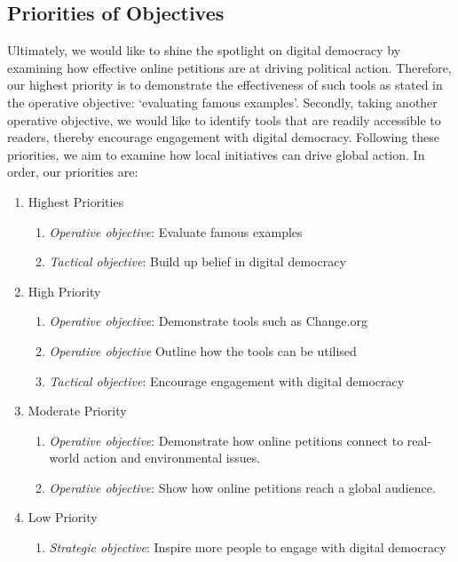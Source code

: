 \subsection{Priorities of Objectives}
Ultimately, we would like to shine the spotlight on digital democracy by examining how effective online petitions are at driving political action. Therefore, our highest priority is to demonstrate the effectiveness of such tools as stated in the operative objective: `evaluating famous examples'. Secondly, taking another operative objective, we would like to identify tools that are readily accessible to readers, thereby encourage engagement with digital democracy. Following these priorities, we aim to examine how local initiatives can drive global action. In order, our priorities are:

\begin{enumerate}
	\item Highest Priorities
    \begin{enumerate}
        \item \emph{Operative objective}: Evaluate famous examples
    	\item \emph{Tactical objective}: Build up belief in digital democracy
  	\end{enumerate}
	\item High Priority
	\begin{enumerate}
	    \item \emph{Operative objective}: Demonstrate tools such as Change.org
	    \item \emph{Operative objective} Outline how the tools can be utilised
    	\item \emph{Tactical objective}: Encourage engagement with digital democracy
  	\end{enumerate}
  	\item Moderate Priority
  	\begin{enumerate}
  	    \item \emph{Operative objective}: Demonstrate how online petitions connect to real-world action and environmental issues.
  	    \item \emph{Operative objective}: Show how online petitions reach a global audience.
  	\end{enumerate}
    \item Low Priority
    \begin{enumerate}
        \item \emph{Strategic objective}: Inspire more people to engage with digital democracy
    \end{enumerate}
\end{enumerate}

